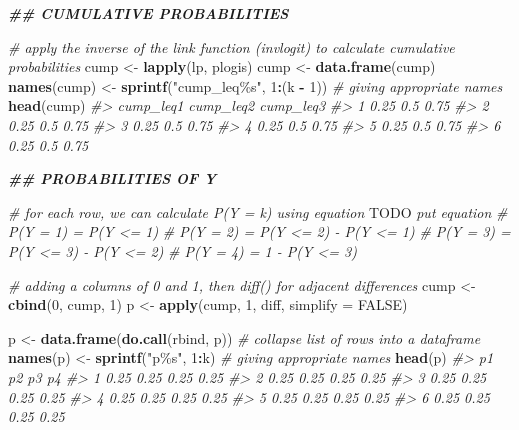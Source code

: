 \documentclass[
  man,floatsintext]{apa6}
\newenvironment{Shaded}{\begin{snugshade}}{\end{snugshade}}
\newcommand{\AlertTok}[1]{\textcolor[rgb]{0.94,0.16,0.16}{#1}}
\newcommand{\AttributeTok}[1]{\textcolor[rgb]{0.13,0.29,0.53}{#1}}
\newcommand{\CommentTok}[1]{\textcolor[rgb]{0.56,0.35,0.01}{\textit{#1}}}
\newcommand{\ConstantTok}[1]{\textcolor[rgb]{0.56,0.35,0.01}{#1}}
\newcommand{\DecValTok}[1]{\textcolor[rgb]{0.00,0.00,0.81}{#1}}
\newcommand{\DocumentationTok}[1]{\textcolor[rgb]{0.56,0.35,0.01}{\textbf{\textit{#1}}}}
\newcommand{\FunctionTok}[1]{\textcolor[rgb]{0.13,0.29,0.53}{\textbf{#1}}}
\newcommand{\NormalTok}[1]{#1}
\newcommand{\OtherTok}[1]{\textcolor[rgb]{0.56,0.35,0.01}{#1}}
\newcommand{\SpecialCharTok}[1]{\textcolor[rgb]{0.81,0.36,0.00}{\textbf{#1}}}
\newcommand{\StringTok}[1]{\textcolor[rgb]{0.31,0.60,0.02}{#1}}
\begin{document}
\begin{Shaded}
\begin{Highlighting}[]
\DocumentationTok{\#\# CUMULATIVE PROBABILITIES}

\CommentTok{\# apply the inverse of the link function (invlogit) to calculate cumulative probabilities}
\NormalTok{cump }\OtherTok{\textless{}{-}} \FunctionTok{lapply}\NormalTok{(lp, plogis)}
\NormalTok{cump }\OtherTok{\textless{}{-}} \FunctionTok{data.frame}\NormalTok{(cump)}
\FunctionTok{names}\NormalTok{(cump) }\OtherTok{\textless{}{-}} \FunctionTok{sprintf}\NormalTok{(}\StringTok{"cump\_leq\%s"}\NormalTok{, }\DecValTok{1}\SpecialCharTok{:}\NormalTok{(k }\SpecialCharTok{{-}} \DecValTok{1}\NormalTok{)) }\CommentTok{\# giving appropriate names}
\FunctionTok{head}\NormalTok{(cump)}
\CommentTok{\#\textgreater{}   cump\_leq1 cump\_leq2 cump\_leq3}
\CommentTok{\#\textgreater{} 1      0.25       0.5      0.75}
\CommentTok{\#\textgreater{} 2      0.25       0.5      0.75}
\CommentTok{\#\textgreater{} 3      0.25       0.5      0.75}
\CommentTok{\#\textgreater{} 4      0.25       0.5      0.75}
\CommentTok{\#\textgreater{} 5      0.25       0.5      0.75}
\CommentTok{\#\textgreater{} 6      0.25       0.5      0.75}

\DocumentationTok{\#\# PROBABILITIES OF Y}

\CommentTok{\# for each row, we can calculate P(Y = k) using equation }\AlertTok{TODO}\CommentTok{ put equation}
\CommentTok{\# P(Y = 1) = P(Y \textless{}= 1)}
\CommentTok{\# P(Y = 2) = P(Y \textless{}= 2) {-} P(Y \textless{}= 1)}
\CommentTok{\# P(Y = 3) = P(Y \textless{}= 3) {-} P(Y \textless{}= 2)}
\CommentTok{\# P(Y = 4) = 1 {-} P(Y \textless{}= 3)}

\CommentTok{\# adding a columns of 0 and 1, then diff() for adjacent differences}
\NormalTok{cump }\OtherTok{\textless{}{-}} \FunctionTok{cbind}\NormalTok{(}\DecValTok{0}\NormalTok{, cump, }\DecValTok{1}\NormalTok{)}
\NormalTok{p }\OtherTok{\textless{}{-}} \FunctionTok{apply}\NormalTok{(cump, }\DecValTok{1}\NormalTok{, diff, }\AttributeTok{simplify =} \ConstantTok{FALSE}\NormalTok{)}

\NormalTok{p }\OtherTok{\textless{}{-}} \FunctionTok{data.frame}\NormalTok{(}\FunctionTok{do.call}\NormalTok{(rbind, p)) }\CommentTok{\# collapse list of rows into a dataframe}
\FunctionTok{names}\NormalTok{(p) }\OtherTok{\textless{}{-}} \FunctionTok{sprintf}\NormalTok{(}\StringTok{"p\%s"}\NormalTok{, }\DecValTok{1}\SpecialCharTok{:}\NormalTok{k) }\CommentTok{\# giving appropriate names}
\FunctionTok{head}\NormalTok{(p)}
\CommentTok{\#\textgreater{}     p1   p2   p3   p4}
\CommentTok{\#\textgreater{} 1 0.25 0.25 0.25 0.25}
\CommentTok{\#\textgreater{} 2 0.25 0.25 0.25 0.25}
\CommentTok{\#\textgreater{} 3 0.25 0.25 0.25 0.25}
\CommentTok{\#\textgreater{} 4 0.25 0.25 0.25 0.25}
\CommentTok{\#\textgreater{} 5 0.25 0.25 0.25 0.25}
\CommentTok{\#\textgreater{} 6 0.25 0.25 0.25 0.25}


\end{Highlighting}
\end{Shaded}
\end{document}

